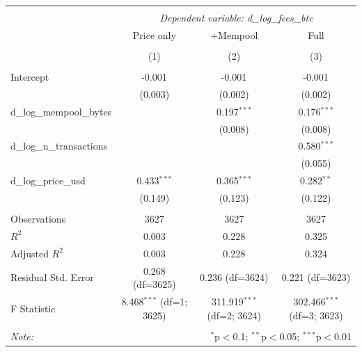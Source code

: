 \begin{table}[!htbp] \centering
\begin{tabular}{@{\extracolsep{5pt}}lccc}
\\[-1.8ex]\hline
\hline \\[-1.8ex]
& \multicolumn{3}{c}{\textit{Dependent variable: d_log_fees_btc}} \
\cr \cline{2-4}
\\[-1.8ex] & \multicolumn{1}{c}{Price only} & \multicolumn{1}{c}{+Mempool} & \multicolumn{1}{c}{Full}  \\
\\[-1.8ex] & (1) & (2) & (3) \\
\hline \\[-1.8ex]
 Intercept & -0.001$^{}$ & -0.001$^{}$ & -0.001$^{}$ \\
& (0.003) & (0.002) & (0.002) \\
 d_log_mempool_bytes & & 0.197$^{***}$ & 0.176$^{***}$ \\
& & (0.008) & (0.008) \\
 d_log_n_transactions & & & 0.580$^{***}$ \\
& & & (0.055) \\
 d_log_price_usd & 0.433$^{***}$ & 0.365$^{***}$ & 0.282$^{**}$ \\
& (0.149) & (0.123) & (0.122) \\
\hline \\[-1.8ex]
 Observations & 3627 & 3627 & 3627 \\
 $R^2$ & 0.003 & 0.228 & 0.325 \\
 Adjusted $R^2$ & 0.003 & 0.228 & 0.324 \\
 Residual Std. Error & 0.268 (df=3625) & 0.236 (df=3624) & 0.221 (df=3623) \\
 F Statistic & 8.468$^{***}$ (df=1; 3625) & 311.919$^{***}$ (df=2; 3624) & 302.466$^{***}$ (df=3; 3623) \\
\hline
\hline \\[-1.8ex]
\textit{Note:} & \multicolumn{3}{r}{$^{*}$p$<$0.1; $^{**}$p$<$0.05; $^{***}$p$<$0.01} \\
\end{tabular}
\end{table}